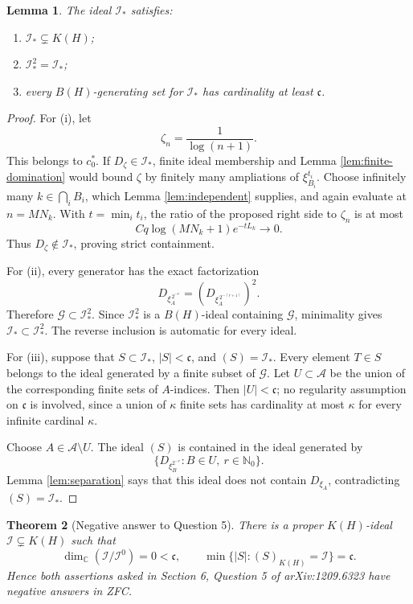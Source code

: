 \documentclass[11pt]{article}
\newtheorem{theorem}{Theorem}
\newtheorem{lemma}[theorem]{Lemma}
\newcommand{\BH}{B(H)}
\newcommand{\KH}{K(H)}
\newcommand{\cc}{\mathfrak c}
\newcommand{\Istar}{\mathcal I_{\!*}}
\begin{document}
\begin{lemma}\label{lem:properties}
The ideal \(\Istar\) satisfies:
\begin{enumerate}[label=\textup{(\roman*)}]
 \item \(\Istar\subsetneq\KH\);
 \item \(\Istar^2=\Istar\);
 \item every \(\BH\)-generating set for \(\Istar\) has cardinality
       at least \(\cc\).
\end{enumerate}
\end{lemma}

\begin{proof}
For (i), let
\[
                    \zeta_n=\frac1{\log(n+1)}.
\]
This belongs to \(c_0^*\).  If \(D_\zeta\in\Istar\), finite ideal
membership and Lemma \ref{lem:finite-domination} would bound \(\zeta\) by
finitely many ampliations of \(\xi_{B_i}^{t_i}\).  Choose infinitely many
\(k\in\bigcap_iB_i\), which Lemma \ref{lem:independent} supplies, and again
evaluate at \(n=MN_k\).  With \(t=\min_i t_i\), the ratio of the proposed
right side to \(\zeta_n\) is at most
\[
          Cq\log(MN_k+1)e^{-tL_k}\longrightarrow0.
\]
Thus \(D_\zeta\notin\Istar\), proving strict containment.

For (ii), every generator has the exact factorization
\[
 D_{\xi_A^{\,2^{-r}}}
   =\left(D_{\xi_A^{\,2^{-(r+1)}}}\right)^2.
\]
Therefore \(\mathcal G\subset\Istar^2\).  Since \(\Istar^2\) is a
\(\BH\)-ideal containing \(\mathcal G\), minimality gives
\(\Istar\subset\Istar^2\).  The reverse inclusion is automatic for every
ideal.

For (iii), suppose that \(S\subset\Istar\), \(|S|<\cc\), and
\((S)=\Istar\).  Every element \(T\in S\) belongs to the ideal generated by
a finite subset of \(\mathcal G\).  Let \(U\subset\mathscr A\) be the union
of the corresponding finite sets of \(A\)-indices.  Then
\(|U|<\cc\); no regularity assumption on \(\cc\) is involved, since a union
of \(\kappa\) finite sets has cardinality at most \(\kappa\) for every
infinite cardinal \(\kappa\).

Choose \(A\in\mathscr A\setminus U\).  The ideal \((S)\) is contained in
the ideal generated by
\[
       \{D_{\xi_B^{2^{-r}}}:B\in U,\ r\in\mathbb N_0\}.
\]
Lemma \ref{lem:separation} says that this ideal does not contain
\(D_{\xi_A}\), contradicting \((S)=\Istar\).
\end{proof}

\begin{theorem}[Negative answer to Question 5]\label{thm:main}
There is a proper \(K(H)\)-ideal \(\mathcal I\subsetneq K(H)\) such that
\[
 \dim_{\mathbb C}(\mathcal I/\mathcal I^0)=0<\cc,
 \qquad
 \min\{|S|:(S)_{K(H)}=\mathcal I\}=\cc.
\]
Hence both assertions asked in Section 6, Question 5 of
arXiv:1209.6323 have negative answers in ZFC.
\end{theorem}
\end{document}
